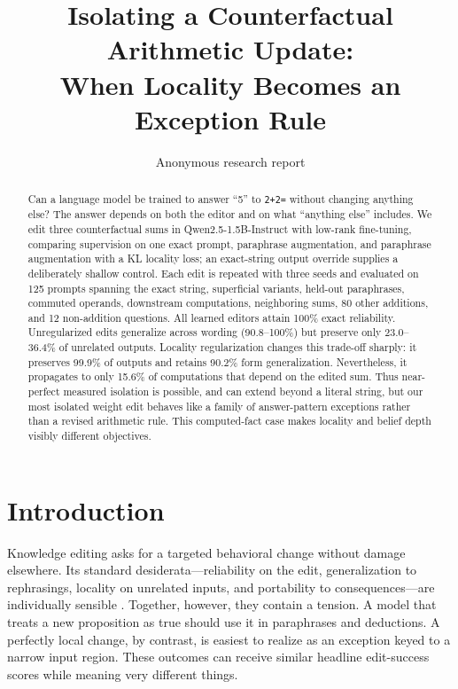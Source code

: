 \documentclass[10pt,twocolumn]{article}
\title{Isolating a Counterfactual Arithmetic Update:\\When Locality Becomes an Exception Rule}
\author{Anonymous research report}
\date{}
\newcommand{\model}{Qwen2.5-1.5B-Instruct}
\begin{document}
\maketitle

\begin{abstract}
Can a language model be trained to answer ``5'' to \texttt{2+2=} without changing anything else?  The answer depends on both the editor and on what ``anything else'' includes.  We edit three counterfactual sums in \model{} with low-rank fine-tuning, comparing supervision on one exact prompt, paraphrase augmentation, and paraphrase augmentation with a KL locality loss; an exact-string output override supplies a deliberately shallow control.  Each edit is repeated with three seeds and evaluated on 125 prompts spanning the exact string, superficial variants, held-out paraphrases, commuted operands, downstream computations, neighboring sums, 80 other additions, and 12 non-addition questions.  All learned editors attain 100\% exact reliability.  Unregularized edits generalize across wording (90.8--100\%) but preserve only 23.0--36.4\% of unrelated outputs.  Locality regularization changes this trade-off sharply: it preserves 99.9\% of outputs and retains 90.2\% form generalization.  Nevertheless, it propagates to only 15.6\% of computations that depend on the edited sum.  Thus near-perfect measured isolation is possible, and can extend beyond a literal string, but our most isolated weight edit behaves like a family of answer-pattern exceptions rather than a revised arithmetic rule.  This computed-fact case makes locality and belief depth visibly different objectives.
\end{abstract}

\section{Introduction}
Knowledge editing asks for a targeted behavioral change without damage elsewhere.  Its standard desiderata---reliability on the edit, generalization to rephrasings, locality on unrelated inputs, and portability to consequences---are individually sensible \citep{zhang2024knowedit}.  Together, however, they contain a tension.  A model that treats a new proposition as true should use it in paraphrases and deductions.  A perfectly local change, by contrast, is easiest to realize as an exception keyed to a narrow input region.  These outcomes can receive similar headline edit-success scores while meaning very different things.
\end{document}
